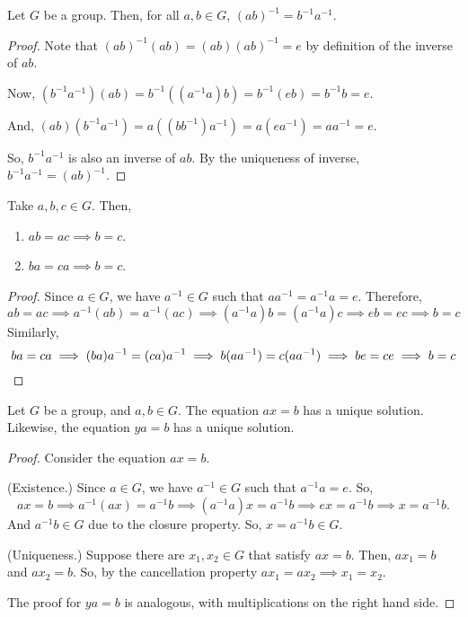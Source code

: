\documentclass[11pt]{penrose}
\begin{document}
\begin{nthm}
    Let $G$ be a group. Then, for all $a, b \in G$, $(ab)^{-1} = b^{-1} a^{-1}$.
\end{nthm}
\begin{proof}
    Note that $(ab)^{-1} (ab) = (ab) (ab)^{-1} = e$ by definition of the inverse of $ab$.

    Now, $(b^{-1} a^{-1}) (a b) = b^{-1} ((a^{-1} a) b) = b^{-1} (e b) = b^{-1} b = e$.

    And, $(a b) (b^{-1} a^{-1}) = a ((b b^{-1}) a^{-1}) = a (e a^{-1}) = a a^{-1} = e$.

    So, $b^{-1} a^{-1}$ is also an inverse of $ab$. By the uniqueness of inverse, $b^{-1} a^{-1} = (ab)^{-1}$.
\end{proof}

\begin{nthm}
    Take $a, b, c \in G$. Then,
    \begin{enumerate}
        \item $ab = ac \implies b = c$.
        \item $ba = ca \implies b = c$.
    \end{enumerate}
\end{nthm}
\begin{proof}
    Since $a \in G$, we have $a^{-1} \in G$ such that $a a^{-1} = a^{-1} a = e$. Therefore,
    \begin{equation*}
        ab = ac
        \implies a^{-1} (ab) = a^{-1} (ac)
        \implies (a^{-1} a)b = (a^{-1} a)c
        \implies eb = ec
        \implies b = c
    \end{equation*}
    Similarly,
    \begin{equation*}
        ba = ca
        \implies (ba)a^{-1} = (ca)a^{-1}
        \implies b (a a^{-1}) = c (a a^{-1})
        \implies be = ce
        \implies b = c
        \qedhere
    \end{equation*}
\end{proof}

\begin{nthm}
    Let $G$ be a group, and $a, b \in G$. The equation $a x = b$ has a unique solution. Likewise, the equation $y a = b$ has a unique solution.
\end{nthm}
\begin{proof}
    Consider the equation $a x = b$.

    (Existence.) Since $a \in G$, we have $a^{-1} \in G$ such that $a^{-1} a = e$. So,
    \begin{equation*}
        ax = b
        \implies a^{-1} (a x) = a^{-1} b
        \implies (a^{-1} a) x = a^{-1} b
        \implies e x = a^{-1} b
        \implies x = a^{-1} b.
    \end{equation*}
    And $a^{-1} b \in G$ due to the closure property. So, $x = a^{-1} b \in G$.

    (Uniqueness.) Suppose there are $x_1, x_2 \in G$ that satisfy $a x = b$. Then, $a x_1 = b$ and $a x_2 = b$. So, by the cancellation property $a x_1 = a x_2 \implies x_1 = x_2$.
    
    The proof for $y a = b$ is analogous, with multiplications on the right hand side.
\end{proof}
\end{document}
